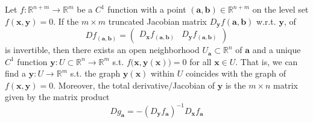   \begin{theorem}
    Let $f: \mathbb{R}^{n+m} \longrightarrow \mathbb{R}^m$ be a $C^1$ function with a point $(\mathbf{a}, \mathbf{b}) \in \mathbb{R}^{n + m}$ on the level set $f( \mathbf{x}, \mathbf{y}) = 0$. If the $m \times m$ truncated Jacobian matrix $D_{\mathbf{y}} f (\mathbf{a}, \mathbf{b})$ w.r.t. $\mathbf{y}$, of 
    \[D f_{(\mathbf{a}, \mathbf{b})} = \begin{pmatrix} D_\mathbf{x} f_{(\mathbf{a}, \mathbf{b})} & D_\mathbf{y} f_{(\mathbf{a}, \mathbf{b})} \end{pmatrix}\]
    is invertible, then there exists an open neighborhood $U_\mathbf{a} \subset \mathbb{R}^n$ of $\mathbf{a}$ and a unique $C^1$ function $\mathbf{y}: U \subset \mathbb{R}^n \longrightarrow \mathbb{R}^m$ s.t. $f\big(\mathbf{x}, \mathbf{y}(\mathbf{x}) \big) = 0$ for all $\mathbf{x} \in U$. That is, we can find a $\mathbf{y}: U \longrightarrow \mathbb{R}^m$ s.t. the graph $\mathbf{y}(\mathbf{x})$ within $U$ coincides with the graph of $f(\mathbf{x}, \mathbf{y}) = 0$. Moreover, the total derivative/Jacobian of $\mathbf{y}$ is the $m \times n$ matrix given by the matrix product 
    \[D g_\mathbf{a} = - (D_\mathbf{y} f_\mathbf{a})^{-1} D_\mathbf{x} f_\mathbf{a}\]
  \end{theorem}

